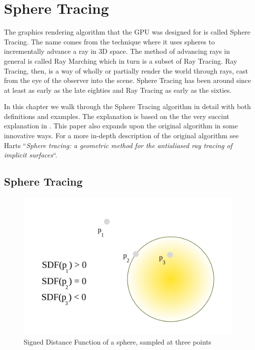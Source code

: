 \chapter{Sphere Tracing} \label{spheretracing}

	The graphics rendering algorithm that the GPU was designed for is called
	Sphere Tracing\cite{Hart1996}. The name comes from the technique where it
	uses spheres to incrementally advance a ray in 3D space. The method of
	advancing rays in general is called Ray Marching which in turn is a subset of
	Ray Tracing\cite{Whitted1980a}. Ray Tracing, then, is a way of wholly or
	partially render the world through rays, cast from the eye of the observer
	into the scene. Sphere Tracing has been around since at least as early as the
	late eighties\cite{Hart1989} and Ray Tracing as early as the
	sixties\cite{Appel1968}.

	In this chapter we walk through the Sphere Tracing algorithm in detail with
	both definitions and examples. The explanation is based on the the very
	succint explanation in \cite{Korndorfer2014}. This paper also expands upon
	the original algorithm in some innovative ways. For a more in-depth
	description of the original algorithm see Harts ``\emph{Sphere tracing: a
	geometric method for the antialiased ray tracing of implicit
	surfaces}``\cite{Hart1996}.

	\section{Sphere Tracing} 

		\begin{figure}
			\begin{flushright}
				\includegraphics[width=0.9\linewidth]{figure/SDF} 
			\end{flushright}
			\caption{ Signed Distance Function of a sphere, sampled at three points}
			\vspace{40pt}
		\end{figure}

